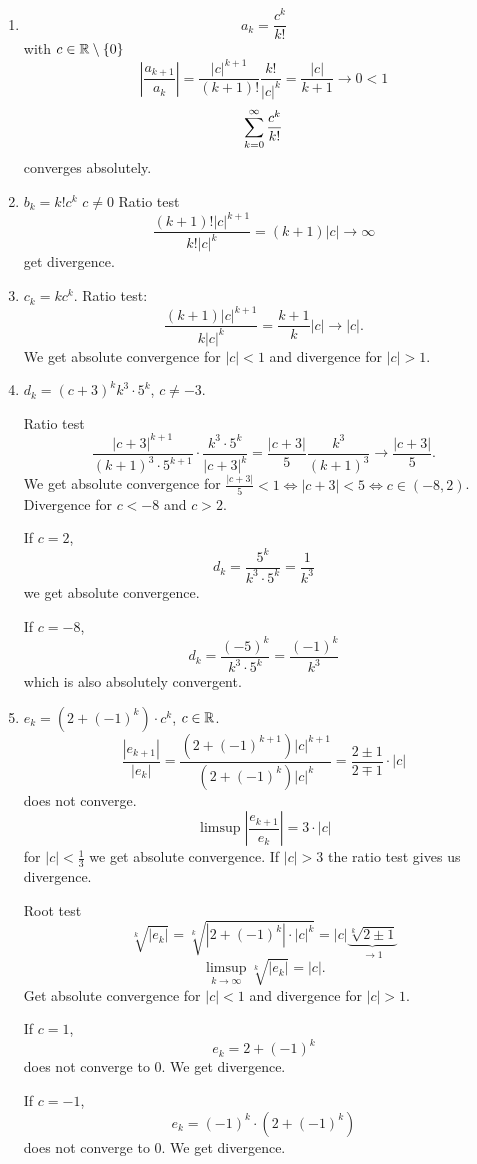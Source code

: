 \documentclass[10pt, a4paper]{article}
\begin{document}
\begin{example}
    \begin{enumerate}[label = (\alph*)]
        \item 
        \[
        a_k = \frac{c ^ k}{k!}
        \]
        with $c \in \R\setminus\{0\}$
        \[
        \left|\frac{a_{k + 1}}{a_k}\right| = \frac{|c| ^ {k + 1}}{(k + 1)!}\frac{k!}{|c| ^ k} = \frac{|c|}{k + 1} \rightarrow 0 < 1
        \]
        \[
        \infsum[k = 0]\frac{c ^ k}{k!}
        \]
        converges absolutely.
        \item $b_k = k!c ^ k$ $c \neq 0$
        Ratio test
        \[
        \frac{(k + 1)!|c| ^ {k + 1}}{k!|c| ^ k} = (k + 1)|c| \rightarrow \infty
        \]
        get divergence.
        \item 
        $c_k = kc ^ k$.
        Ratio test:
        \[
        \frac{(k + 1)|c| ^ {k + 1}}{k|c| ^ k} = \frac{k + 1}{k}|c| \rightarrow |c|.
        \]
        We get absolute convergence for $|c| < 1$ and divergence for $|c| > 1$.
        \item $d_k = {(c + 3) ^ k}{k ^ 3 \cdot 5 ^ k}$,
        $c \neq -3$.

        Ratio test
        \[
        \frac{|c + 3| ^ {k + 1}}{(k + 1) ^ 3\cdot 5 ^ {k + 1}} \cdot \frac{k ^ 3 \cdot 5 ^ k}{|c + 3| ^ k} = \frac{|c + 3|}{5}\frac{k ^ 3}{(k + 1) ^ 3} \rightarrow \frac{|c + 3|}{5}.
        \]
        We get absolute convergence for $\frac{|c + 3|}{5} < 1 \iff |c + 3| < 5 \iff c \in (-8, 2)$.
        Divergence for $c < -8$ and $c > 2$.
        
        If $c = 2$,
        \[
        d_k = \frac{5 ^ k}{k ^ 3 \cdot 5 ^ k} = \frac{1}{k ^ 3}
        \]
        we get absolute convergence.

        If $c = -8$,
        \[
        d_k = \frac{(-5) ^ k}{k ^ 3 \cdot 5 ^ k} = \frac{(-1) ^ k}{k ^ 3}
        \]
        which is also absolutely convergent.
        \item $e_k = (2 + (-1) ^ k) \cdot c ^ k$,
        $c \in \R$.
        \[
        \frac{|e_{k + 1}|}{|e_k|} = \frac{(2 + (-1) ^ {k + 1})|c| ^ {k + 1}}{(2 + (-1) ^ k)|c| ^ k} = \frac{2 \pm 1}{2 \mp 1}\cdot |c|
        \]
        does not converge.
        \[
        \limsup\left|\frac{e_{k + 1}}{e_k}\right| = 3\cdot|c|
        \]
        for $|c| < \frac{1}{3}$ we get absolute convergence.
        If $|c| > 3$ the ratio test gives us divergence.

        Root test 
        \[
        \sqrt[k]{|e_k|} = \sqrt[k]{|2 + (-1) ^ k| \cdot |c| ^ k} = |c|\underbrace{\sqrt[k]{2 \pm 1}}_{\rightarrow 1}
        \]
        \[
        \limsup_{k \rightarrow \infty}\sqrt[k]{|e_k|} = |c|.
        \]
        Get absolute convergence for $|c| < 1$ and divergence for $|c| > 1$.

        If $c = 1$,
        \[
        e_k = 2 + (-1) ^ k
        \]
        does not converge to $0$.
        We get divergence.

        If $c = -1$,
        \[
        e_k = (-1) ^ k \cdot (2 + (-1) ^ k)
        \]
        does not converge to $0$.
        We get divergence.
    \end{enumerate}
\end{example}
\end{document}
